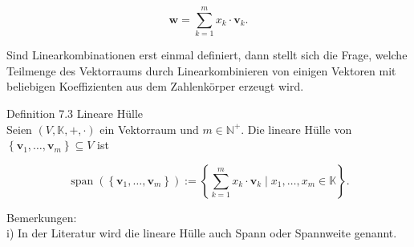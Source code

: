 \documentclass[10pt]{article}
\begin{document}
\begin{equation*}
\mathbf{w}=\sum_{k=1}^{m} x_{k} \cdot \mathbf{v}_{k} . \tag{7.11}
\end{equation*}


Sind Linearkombinationen erst einmal definiert, dann stellt sich die Frage, welche Teilmenge des Vektorraums durch Linearkombinieren von einigen Vektoren mit beliebigen Koeffizienten aus dem Zahlenkörper erzeugt wird.

Definition 7.3 Lineare Hülle\\
Seien $(V, \mathbb{K},+, \cdot)$ ein Vektorraum und $m \in \mathbb{N}^{+}$. Die lineare Hülle von $\left\{\mathbf{v}_{1}, \ldots, \mathbf{v}_{m}\right\} \subseteq V$ ist


\begin{equation*}
\operatorname{span}\left(\left\{\mathbf{v}_{1}, \ldots, \mathbf{v}_{m}\right\}\right):=\left\{\sum_{k=1}^{m} x_{k} \cdot \mathbf{v}_{k} \mid x_{1}, \ldots, x_{m} \in \mathbb{K}\right\} . \tag{7.12}
\end{equation*}


Bemerkungen:\\
i) In der Literatur wird die lineare Hülle auch Spann oder Spannweite genannt.
\end{document}

